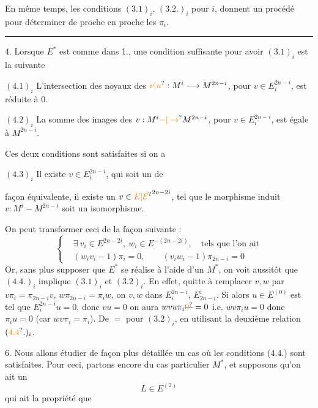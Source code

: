 En même temps, les conditions $(3.1)_i$, $(3.2.)_i$ pour  $i$, donnent un  procédé pour déterminer de proche en proche les $\pi_i$.

\medskip\hrule\medskip

4. Lorsque $E^*$ est comme dans 1., une condition suffisante pour avoir $(3.1)_i$  est la  suivante

$(4.1)_i$ L'intersection des noyaux des $\unsure{v|u}:M^i\longrightarrow M^{2n-i}$, pour $v\in E_i^{2n-i}$, est réduite à 0.

$(4.2)_i$ La somme des images des $v:M^i\unsure{-|\to}M^{2n-i}$, pour $v\in E_i^{2n-i}$, est  égale à $M^{2n-i}$.

Ces deux conditions sont satisfaites si on a

$(4.3)_i$ Il existe  $v\in E_i^{2n-i}$, qui soit un  de

façon équivalente, il existe un $v\in \unsure{E|\mathcal E}^{2n-2i}$, tel que le morphisme induit $v:M^i- M^{2n-i}$ soit un isomorphisme.

On peut transformer ceci de la façon suivante :
\[
 \left\{\begin{aligned}
 &\exists\ v_i\in E^{2n-2i},\ w_i\in E^{-(2n-2i)},\quad\text{tels que l'on ait}\\
 &(w_i v_i-1)\pi_i=0,\qquad(v_i w_i-1)\pi_{2n-i}=0
 \end{aligned}\right.
 \tag*{$(4.4.)_i$}
\]
Or, sans plus supposer que $E^*$ se réalise à l'aide d'un $M^*$, on voit aussitôt que $(4.4.)_i$ implique $(3.1)_i$ et $(3.2)_i$. En effet, quitte à remplacer $v,w$ par $v\pi_i=\pi_{2n-i}v$, $w\pi_{2n-i}=\pi_i w$, on  $v,w$ dans $E_i^{2n-i}$, $E_{2n-i}^i$. Si alors  $u\in E^{(0)}$ est tel que $E_i^{2n-i}u=0$, donc $vu=0$ on aura $wvu\pi_i\deleted{\unsure{0}}=0$ i.e. $wv\pi_i u=0$ donc $\pi_i u=0$ (car $wv\pi_i=\pi_i$). De $=$ pour $(3.2)_i$, en utilisant la deuxième relation $(\unsure{4.4}.)_i$.


6. Nous allons étudier de façon plus détaillée un cas où les conditions (4.4.) sont satisfaites. Pour ceci, partons encore du cas particulier $M^*$,  et supposons qu'on ait un
\[
 L\in E^{(2)}
 \tag*{(6.0)}
\]
qui ait la propriété que

